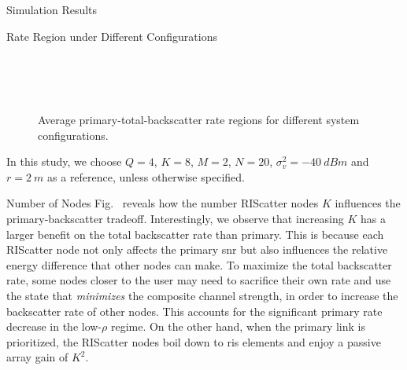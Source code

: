 \begin{section}{Simulation Results}
	\begin{subsection}{Rate Region under Different Configurations}
		\begin{figure}[!t]
			\centering
			\\
			\\
			\\
			\caption{
				Average primary-total-backscatter rate regions for different system configurations.
			}
			\label{fg:region_config}
		\end{figure}
		In this study, we choose $Q=4$, $K=8$, $M=2$, $N=20$, $\sigma_v^2=\qty{-40}{dBm}$ and $r=\qty{2}{m}$ as a reference, unless otherwise specified.
		\begin{subsubsection}{Number of Nodes}
			Fig.~ reveals how the number RIScatter nodes $K$ influences the primary-backscatter tradeoff.
			Interestingly, we observe that increasing $K$ has a larger benefit on the total backscatter rate than primary.
			This is because each RIScatter node not only affects the primary \gls{snr} but also influences the relative energy difference that other nodes can make.
			To maximize the total backscatter rate, some nodes closer to the user may need to sacrifice their own rate and use the state that \emph{minimizes} the composite channel strength, in order to increase the backscatter rate of other nodes.
			This accounts for the significant primary rate decrease in the low-$\rho$ regime.
			On the other hand, when the primary link is prioritized, the RIScatter nodes boil down to \gls{ris} elements and enjoy a passive array gain of $K^2$.
		\end{subsubsection}


\end{subsection}
\end{section}
